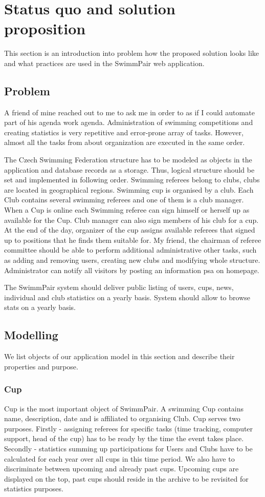 \chapter{Status quo and solution proposition}
This section is an introduction into problem how the proposed solution looks like and what practices are used in the SwimmPair web application. 
\section{Problem}
\par
A friend of mine reached out to me to ask me in order to as if I could automate part of his agenda work agenda. Administration of swimming competitions and creating statistics is very repetitive and error-prone array of tasks. However, almost all the tasks from about organization are executed in the same order.
\par
The Czech Swimming Federation structure has to be modeled as objects in the application and database records as a storage. Thus, logical structure should be set and implemented in following order. Swimming referees belong to clubs, clubs are located in geographical regions. Swimming cup is organised by a club. Each Club contains several swimming referees and one of them is a club manager. When a Cup is online each Swimming referee can sign himself or herself up as available for the Cup. Club manager can also sign members of his club for a cup. At the end of the day, organizer of the cup assigns available referees that signed up to positions that he finds them suitable for. My friend, the chairman of referee committee should be able to perform additional administrative other tasks, such as adding and removing users, creating new clubs and modifying whole structure. Administrator can notify all visitors by posting an information psa on homepage.
\par
The SwimmPair system should deliver public listing of users, cups, news, individual and club statistics on a yearly basis. System should allow to browse stats on a yearly basis. 


\section{Modelling}
We list objects of our application model in this section and describe their properties and purpose.
\subsection*{Cup}
Cup is the most important object of SwimmPair. A swimming Cup contains name, description, date and is affiliated to organising Club. Cup serves two purposes. Firstly - assigning referees for specific tasks (time tracking, computer support, head of the cup) has to be ready by the time the event takes place. Secondly - statistics summing up participations for Users and Clubs have to be calculated for each year over all cups in this time period. We also have to discriminate between upcoming and already past cups. Upcoming cups are displayed on the top, past cups should reside in the archive to be revisited for statistics purposes.
